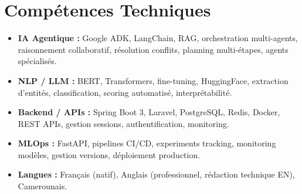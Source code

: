 \documentclass[a4paper,11pt]{article}
\begin{document}
\section{Comp\'etences Techniques}
\begin{itemize}[leftmargin=*, nosep]
    \item \small{\textbf{IA Agentique :} Google ADK, LangChain, RAG, orchestration multi-agents, raisonnement collaboratif, résolution conflits, planning multi-étapes, agents spécialisés.}
    \item \small{\textbf{NLP / LLM :} BERT, Transformers, fine-tuning, HuggingFace, extraction d'entités, classification, scoring automatisé, interprétabilité.}
    \item \small{\textbf{Backend / APIs :} Spring Boot 3, Laravel, PostgreSQL, Redis, Docker, REST APIs, gestion sessions, authentification, monitoring.}
    \item \small{\textbf{MLOps :} FastAPI, pipelines CI/CD, experiments tracking, monitoring modèles, gestion versions, déploiement production.}
    \item \small{\textbf{Langues :} Français (natif), Anglais (professionnel, rédaction technique EN), Camerounais.}
\end{itemize}
\end{document}
